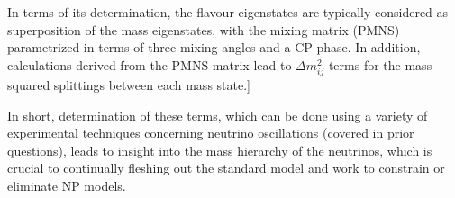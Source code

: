 \documentclass[]{article}
\begin{document}
		In terms of its determination, the flavour eigenstates are typically considered as superposition of the mass eigenstates, with the mixing matrix (PMNS) parametrized in terms of three mixing angles and a CP phase. In addition, calculations derived from the PMNS matrix lead to $\Delta m_{ij}^2$ terms for the mass squared splittings between each mass state.]
		
		In short, determination of these terms, which can be done using a variety of experimental techniques concerning neutrino oscillations (covered in prior questions), leads to insight into the mass hierarchy of the neutrinos, which is crucial to continually fleshing out the standard model and work to constrain or eliminate NP models.
	
	
	
	



	
	
	
	
	
\end{document}
